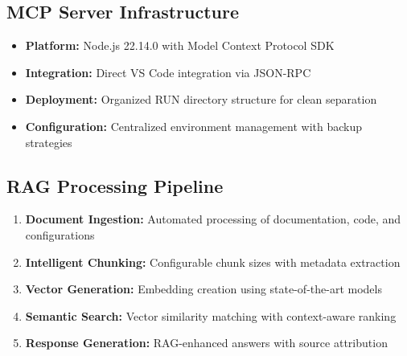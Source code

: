 \documentclass[11pt,letterpaper]{article}
\begin{document}
\subsection{MCP Server Infrastructure}
\begin{itemize}
    \item \textbf{Platform:} Node.js 22.14.0 with Model Context Protocol SDK
    \item \textbf{Integration:} Direct VS Code integration via JSON-RPC
    \item \textbf{Deployment:} Organized RUN directory structure for clean separation
    \item \textbf{Configuration:} Centralized environment management with backup strategies
\end{itemize}

\subsection{RAG Processing Pipeline}

\begin{center}
\end{center}

\begin{enumerate}
    \item \textbf{Document Ingestion:} Automated processing of documentation, code, and configurations
    \item \textbf{Intelligent Chunking:} Configurable chunk sizes with metadata extraction
    \item \textbf{Vector Generation:} Embedding creation using state-of-the-art models
    \item \textbf{Semantic Search:} Vector similarity matching with context-aware ranking
    \item \textbf{Response Generation:} RAG-enhanced answers with source attribution
\end{enumerate}
\end{document}
